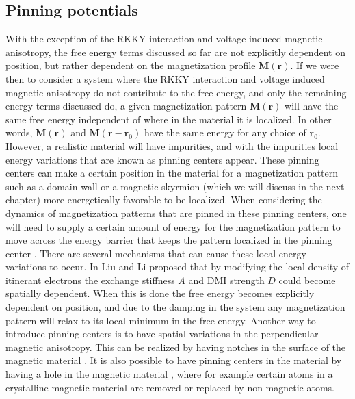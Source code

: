 \subsection{Pinning potentials}
With the exception of the RKKY interaction and voltage induced magnetic anisotropy, the free energy terms discussed so far are not explicitly dependent on position, but rather dependent on the magnetization profile $\mathbold{M}(\mathbold{r})$. If we were then to consider a system where the RKKY interaction and voltage induced magnetic anisotropy do not contribute to the free energy, and only the remaining energy terms discussed do, a given magnetization pattern $\mathbold{M}(\mathbold{r})$ will have the same free energy independent of where in the material it is localized. In other words, $\mathbold{M}(\mathbold{r})$ and $\mathbold{M}(\mathbold{r}-\mathbold{r}_0)$ have the same energy for any choice of $\mathbold{r}_0$. However, a realistic material will have impurities, and with the impurities local energy variations that are known as pinning centers appear. These pinning centers can make a certain position in the material for a magnetization pattern such as a domain wall or a magnetic skyrmion (which we will discuss in the next chapter) more energetically favorable to be localized. When considering the dynamics of magnetization patterns that are pinned in these pinning centers, one will need to supply a certain amount of energy for the magnetization pattern to move across the energy barrier that keeps the pattern localized in the pinning center \cite{Grollier2003,Parkin2008,Jonietz2010}. There are several mechanisms that can cause these local energy variations to occur. In \cite{LiuLi2013} Liu and Li proposed that by modifying the local density of itinerant electrons the exchange stiffness $A$ and DMI strength $D$ could become spatially dependent. When this is done the free energy becomes explicitly dependent on position, and due to the damping in the system any magnetization pattern will relax to its local minimum in the free energy. Another way to introduce pinning centers is to have spatial variations in the perpendicular magnetic anisotropy. This can be realized by having notches in the surface of the magnetic material \cite{Sampaio2013}. It is also possible to have pinning centers in the material by having a hole in the magnetic material \cite{Muller2015}, where for example certain atoms in a crystalline magnetic material are removed or replaced by non-magnetic atoms. 

